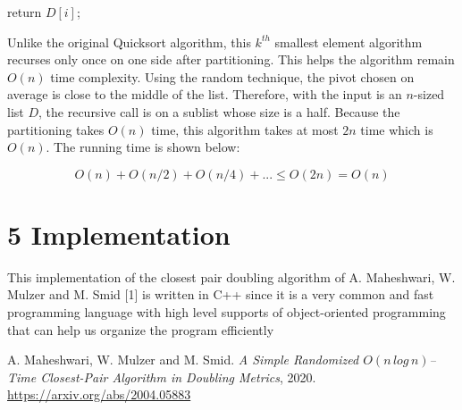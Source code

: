 \documentclass[12pt,english,]{article}
\let\origfigure\figure
\let\endorigfigure\endfigure
\renewenvironment{figure}[1][2] {
    \expandafter\origfigure\expandafter[H]
} {
    \endorigfigure
}
\begin{document}
\begin{figure}[ht]
  \centering
  \begin{minipage}{.8\linewidth}
    {\LinesNotNumbered
    \SetAlgoRefName{}
    \begin{algorithm}[H]
    \SetAlgoLined
    \BlankLine
         {
            return $D[i]$;
        }
    \caption{\textsc{KthSmallest}$(D, a, b, k)$}
    \end{algorithm}}
  \end{minipage}
\end{figure}

Unlike the original Quicksort algorithm, this \(k^{th}\) smallest
element algorithm recurses only once on one side after partitioning.
This helps the algorithm remain \(O(n)\) time complexity. Using the
random technique, the pivot chosen on average is close to the middle of
the list. Therefore, with the input is an \(n\)-sized list \(D\), the
recursive call is on a sublist whose size is a half. Because the
partitioning takes \(O(n)\) time, this algorithm takes at most \(2n\)
time which is \(O(n)\). The running time is shown below:

\[O(n) + O(n/2) + O(n/4) +... \leq O(2n) = O(n)\]

\hypertarget{implementation}{%
\section{\texorpdfstring{5
\enspace Implementation}{5 Implementation}}\label{implementation}}

This implementation of the closest pair doubling algorithm of A.
Maheshwari, W. Mulzer and M. Smid {[}1{]} is written in C++ since it is
a very common and fast programming language with high level supports of
object-oriented programming that can help us organize the program
efficiently

\medskip

\begin{thebibliography}{9}
A. Maheshwari, W. Mulzer and M. Smid. \emph{A Simple Randomized $O(n\,log\,n)$–Time Closest-Pair Algorithm in Doubling Metrics}, 2020. \url{https://arxiv.org/abs/2004.05883}
\end{thebibliography}
\end{document}
